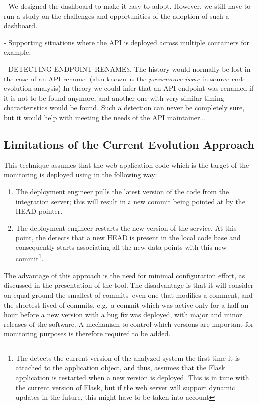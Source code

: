 - We designed the dashboard to make it easy to adopt. However, we still have to run a study on the challenges and opportunities of the adoption of such a dashboard. 


-   Supporting situations where the API is deployed across multiple containers for example.

-   DETECTING ENDPOINT RENAMES.  The history would normally be lost in the case of an API rename. (also known as the {\em provenance issue} in source code evolution analysis)
    In theory we could infer that an API endpoint was renamed if it is not to be found anymore, and another one with very similar timing characteristics would be found. Such a detection can never be completely sure, but it would help with meeting the needs of the API maintainer... 







  \subsection*{Limitations of the Current Evolution Approach}
  This technique assumes that the web application code which is the target of the monitoring is deployed using \git in the following way: 

  \begin{enumerate}
    \item The deployment engineer pulls the latest version of the code from the integration server; this will result in a new commit being pointed at by the HEAD pointer. %
    \item The deployment engineer restarts the new version of the service. At this point, the \tool detects that a new HEAD is present in the local code base and consequently starts associating all the new data points with this new commit\footnote{The \tool detects the current version of the analyzed system the first time it is attached to the application object, and thus, assumes that the Flask application is restarted when a new version is deployed. This is in tune with the current version of Flask, but if the web server will support dynamic updates in the future, this might have to be taken into account}.
  \end{enumerate}

    The advantage of this approach is the need for minimal configuration effort, as discussed in the presentation of the tool. The disadvantage is that it will consider on equal ground the smallest of commits, even one that modifies a comment, and the shortest lived of commits, e.g.~a commit which was active only for a half an hour before a new version with a bug fix was deployed, with major and minor releases of the software. %
  A mechanism to control which versions are important for monitoring purposes is therefore required to be added.
%


